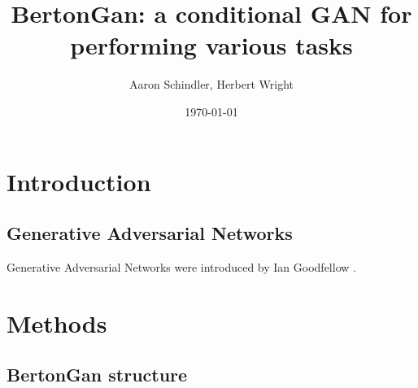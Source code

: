 \documentclass{article}
\title{BertonGan: a conditional GAN for performing various tasks}
\author{ Aaron Schindler, Herbert Wright }
\date{\today}
\begin{document}
\maketitle
\pagebreak

\section{Introduction}

\subsection{Generative Adversarial Networks}

Generative Adversarial Networks were introduced by Ian Goodfellow \cite{goodfellow2020generative}.

\section{Methods}

\subsection{BertonGan structure}
\end{document}
